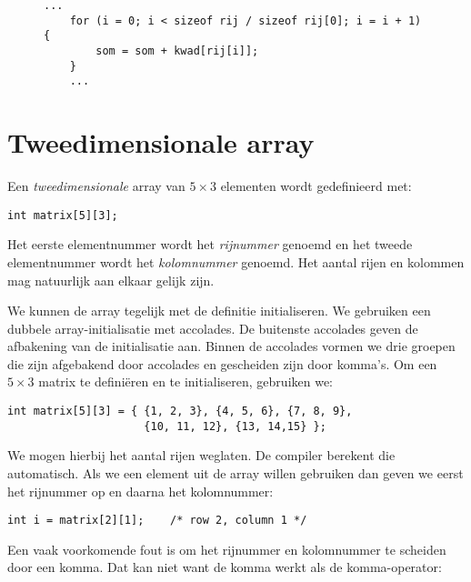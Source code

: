 \begin{figure}[!ht]
\begin{lstlisting}[caption=Bepalen van het aantal elementen in een array.,label=cod:arrberekenensomrijkwadraten2]
    ...
    for (i = 0; i < sizeof rij / sizeof rij[0]; i = i + 1) {
        som = som + kwad[rij[i]];
    }
    ...
\end{lstlisting}
\end{figure}



\section{Tweedimensionale array}
Een \textsl{tweedimensionale} array van $5\times3$ elementen wordt gedefinieerd met:

\begin{lstlisting}[style=lstoneline]
int matrix[5][3];
\end{lstlisting}

Het eerste elementnummer wordt het \textsl{rijnummer} genoemd en het tweede elementnummer wordt het \textsl{kolomnummer} genoemd. Het aantal rijen en kolommen mag natuurlijk aan elkaar gelijk zijn.

We kunnen de array tegelijk met de definitie initialiseren. We gebruiken een dubbele array-initialisatie met accolades. De buitenste accolades geven de afbakening van de initialisatie aan. Binnen de accolades vormen we drie groepen die zijn afgebakend door accolades en gescheiden zijn door komma's. Om een $5\times3$ matrix te definiëren en te initialiseren, gebruiken we:

\begin{lstlisting}[style=lstoneline]
int matrix[5][3] = { {1, 2, 3}, {4, 5, 6}, {7, 8, 9},
                     {10, 11, 12}, {13, 14,15} };
\end{lstlisting}

We mogen hierbij het aantal rijen weglaten. De compiler berekent die automatisch. Als we een element uit de array willen gebruiken dan geven we eerst het rijnummer op en daarna het kolomnummer:

\begin{lstlisting}[style=lstoneline]
int i = matrix[2][1];    /* row 2, column 1 */
\end{lstlisting}
Een vaak voorkomende fout is om het rijnummer en kolomnummer te scheiden door een komma. Dat kan niet want de komma werkt als de komma-operator:

